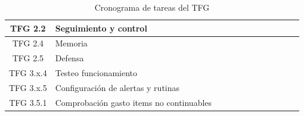 \begin{table}[h!]
\begin{tabular}{|c|l|c|c|c|c|c|c|c|c|c|c|}
        TFG 2.2                & Seguimiento y control                    & \cellcolor{ganttblue} & \cellcolor{ganttblue}                      & \cellcolor{ganttblue} & \cellcolor{ganttblue} & \cellcolor{ganttblue} & \cellcolor{ganttblue} &                       &                       &                       & \hspace{0pt} \\
        \hline
        TFG 2.4                & Memoria                                  & \cellcolor{ganttblue} & \cellcolor{ganttblue}                      & \cellcolor{ganttblue} & \cellcolor{ganttblue} & \cellcolor{ganttblue} & \cellcolor{ganttblue} & \cellcolor{ganttblue} &                       &                       & \hspace{0pt} \\
        \hline
        TFG 2.5                & Defensa                                  &                       &                                            &                       &                       &                       &                       &                       & \cellcolor{ganttblue} & \cellcolor{ganttblue} & \hspace{0pt} \\
        \hline
        TFG 3.x.4              & Testeo funcionamiento                    & \cellcolor{ganttblue} & \cellcolor{ganttblue}                      & \cellcolor{ganttblue} &                       &                       &                       &                       &                       &                       & \hspace{0pt} \\
        \hline
        TFG 3.x.5              & Configuración de alertas y rutinas       & \cellcolor{ganttblue} & \cellcolor{ganttblue}                      &                       &                       &                       &                       &                       &                       &                       & \hspace{0pt} \\
        \hline
        TFG 3.5.1              & Comprobación gasto items no continuables & \cellcolor{ganttblue} & \cellcolor{ganttblue}                      &                       &                       &                       &                       &                       &                       &                       & \hspace{0pt} \\
        \hline
    \end{tabular}
    \caption{Cronograma de tareas del TFG}
\end{table}

